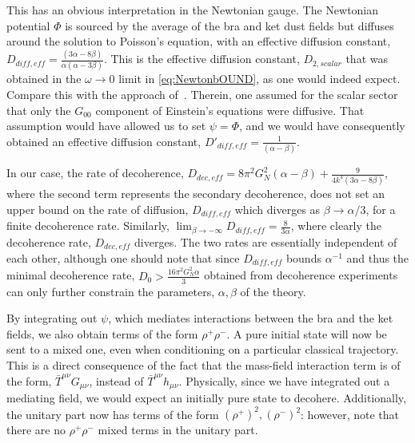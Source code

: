 \documentclass[aps,preprintnumbers,superscriptaddress,longbibliography]{revtex4-1}
\begin{document}
This has an obvious interpretation in the Newtonian gauge. The Newtonian potential $\Phi$ is sourced by the average of the bra and ket dust fields but diffuses around the solution to Poisson's equation, with an effective diffusion constant, $D_{diff,eff}=\frac{(3\alpha-8\beta)}{\alpha(\alpha-3\beta)}$. This is the effective diffusion constant, $D_{2,scalar}$ that was obtained in the $\omega\rightarrow0$ limit in \eqref{eq:NewtonbOUND}, as one would indeed expect.
Compare this with the approach of~\cite{layton2023weak}. Therein, one assumed for the scalar sector that only the $G_{00}$ component of Einstein's equations were diffusive. That assumption would have allowed us to set $\psi=\Phi$, and we would have consequently obtained an effective diffusion constant, $D'_{diff,eff}=\frac{1}{(\alpha-\beta)}$.  

In our case, the rate of decoherence, $D_{dec,eff}=8\pi^2G_N^2(\alpha-\beta)+\frac{9}{4k^4(3\alpha-8\beta)}$, where the second term represents the secondary decoherence,  does not set an upper bound on the rate of diffusion, $D_{diff,eff}$ which diverges as $\beta \rightarrow \alpha/3$, for a finite decoherence rate. Similarly, $\lim_{\beta\rightarrow-\infty} D_{diff,eff}=\frac{8}{3\alpha}$, where clearly the decoherence rate, $D_{dec,eff}$ diverges. The two rates are essentially independent of each other, although one should note that since $D_{diff,eff}$ bounds $\alpha^{-1}$ and thus the minimal decoherence rate, $D_0>\frac{16\pi^2G_N^2\alpha}{3}$ obtained from decoherence experiments can only further constrain the parameters, $\alpha,\beta$ of the theory. 

By integrating out $\psi$, which mediates interactions between the bra and the ket fields, we also obtain terms of the form $\rho^{+}\rho^{-}$. A pure initial state will now be sent to a mixed one, even when conditioning on a particular classical trajectory.
This is a direct consequence of the fact that the mass-field interaction term is of the form, $\bar{T}^{\mu \nu}G_{\mu\nu}$, instead of $\bar{T}^{\mu\nu}h_{\mu\nu}$. Physically, since we have integrated out a mediating field, we would expect an initially pure state to decohere.
Additionally, the unitary part now has terms of the form $(\rho^{+})^2,(\rho^{-})^2$: however, note that there are no $\rho^{+}\rho^{-}$ mixed terms in the unitary part. 
\end{document}
